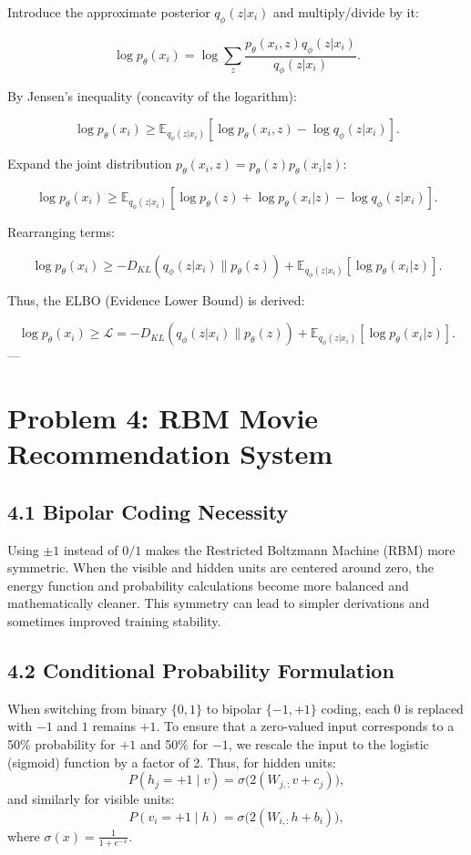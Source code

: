 \documentclass[11pt]{article}
\begin{document}
Introduce the approximate posterior \( q_\phi(z | x_i) \) and multiply/divide by it:

\[
\log p_\theta(x_i) = \log \sum_z \frac{p_\theta(x_i, z) q_\phi(z | x_i)}{q_\phi(z | x_i)}.
\]

By Jensen's inequality (concavity of the logarithm):

\[
\log p_\theta(x_i) \geq \mathbb{E}_{q_\phi(z | x_i)} \left[ \log p_\theta(x_i, z) - \log q_\phi(z | x_i) \right].
\]

Expand the joint distribution \( p_\theta(x_i, z) = p_\theta(z) p_\theta(x_i | z) \):

\[
\log p_\theta(x_i) \geq \mathbb{E}_{q_\phi(z | x_i)} \left[ \log p_\theta(z) + \log p_\theta(x_i | z) - \log q_\phi(z | x_i) \right].
\]

Rearranging terms:

\[
\log p_\theta(x_i) \geq -D_{KL} \left( q_\phi(z | x_i) \| p_\theta(z) \right) + \mathbb{E}_{q_\phi(z | x_i)} \left[ \log p_\theta(x_i | z) \right].
\]

Thus, the ELBO (Evidence Lower Bound) is derived:

\[
\log p_\theta(x_i) \geq \mathcal{L} = -D_{KL} \left( q_\phi(z | x_i) \| p_\theta(z) \right) + \mathbb{E}_{q_\phi(z | x_i)} \left[ \log p_\theta(x_i | z) \right].
\]
---

\section*{Problem 4: RBM Movie Recommendation System}

\subsection*{4.1 Bipolar Coding Necessity}
Using $\pm 1$ instead of $0/1$ makes the Restricted Boltzmann Machine (RBM) more symmetric. When the visible and hidden units are centered around zero, the energy function and probability calculations become more balanced and mathematically cleaner. This symmetry can lead to simpler derivations and sometimes improved training stability.

\subsection*{4.2 Conditional Probability Formulation}
When switching from binary $\{0,1\}$ to bipolar $\{-1,+1\}$ coding, each $0$ is replaced with $-1$ and $1$ remains $+1$. To ensure that a zero-valued input corresponds to a 50\% probability for $+1$ and 50\% for $-1$, we rescale the input to the logistic (sigmoid) function by a factor of 2. Thus, for hidden units:
\[
P(h_j = +1 \mid v) = \sigma\bigl(2(W_{j,:}v + c_j)\bigr),
\]
and similarly for visible units:
\[
P(v_i = +1 \mid h) = \sigma\bigl(2(W_{i,:}h + b_i)\bigr),
\]
where $\sigma(x) = \frac{1}{1 + e^{-x}}$.
\end{document}
